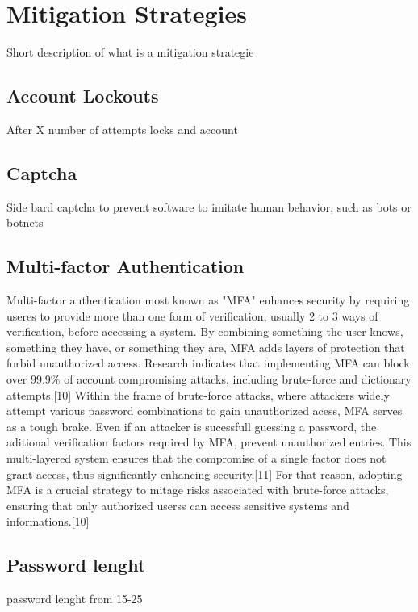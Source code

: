 \documentclass{comjnl}
\begin{document}
\section{Mitigation Strategies}

Short description of what is a mitigation strategie

\subsection{Account Lockouts}
After X number of attempts locks and account

\subsection{Captcha}

Side bard captcha to prevent software to imitate human behavior, such as bots or botnets


\subsection{Multi-factor Authentication}

Multi-factor authentication most known as "MFA" enhances security by requiring useres to provide more than one form of verification, usually 2 to 3 ways of verification, before accessing a system. By combining something the user knows, something they have, or something they are, MFA adds layers of protection that forbid unauthorized access. Research indicates that implementing MFA can block over 99.9\% of account compromising attacks, including brute-force and dictionary attempts.[10]
Within the frame of brute-force attacks, where attackers widely attempt various password combinations to gain unauthorized acess, MFA serves as a tough brake. Even if an attacker is sucessfull guessing a password, the aditional verification factors required by MFA, prevent unauthorized entries. This multi-layered system ensures that the compromise of a single factor does not grant access, thus significantly enhancing security.[11]
For that reason, adopting MFA is a crucial strategy to mitage risks associated with brute-force attacks, ensuring that only authorized userss can access sensitive systems and informations.[10]

\subsection{Password lenght}

password lenght from 15-25
\end{document}
